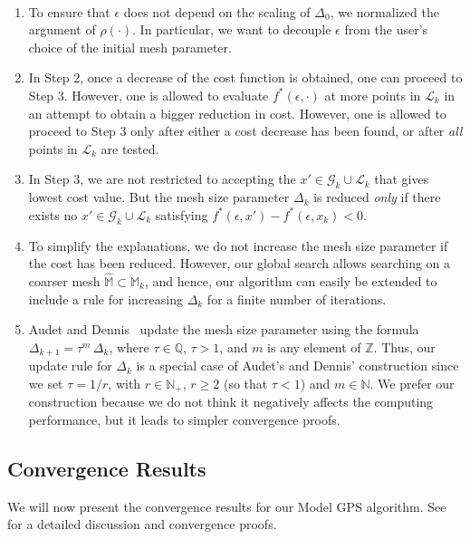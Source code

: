 \begin{remark}~\newline 
\vspace{-1.5\baselineskip}
{ \em 
\begin{enumerate} 
\item
To ensure that $\epsilon$ does not depend on the scaling of $\Delta_0$,
we normalized the argument of $\rho(\cdot)$.
In particular, we want to decouple $\epsilon$ from
the user's choice of the initial mesh parameter.
\item
In Step 2, once a decrease of the cost function is obtained, one
can proceed to Step 3. However, one is allowed to evaluate $f^*(\epsilon,\cdot)$
at more points in $\mathcal L_k$ in an
attempt to obtain a bigger reduction in cost.  However,
one is allowed to proceed to Step 3 only after 
either a cost decrease has been found, or after {\em all} points in 
$\mathcal L_k$ are tested.
\item
In Step 3, we are not restricted to accepting the
$x' \in \mathcal G_k \cup \mathcal L_k$ that gives lowest cost value.
But the mesh size parameter $\Delta_k$ is reduced {\em only}
if there exists no $x' \in \mathcal G_k \cup \mathcal L_k$ satisfying
$f^*(\epsilon, x') - f^*(\epsilon, x_k) < 0$.
\item
To simplify the explanations, we do
not increase the mesh size parameter if the cost has been reduced.
However, our global search allows searching on a coarser mesh 
$\widehat {\mathbb M} \subset \mathbb M_k$,
and hence, our algorithm can easily be extended to include a rule for increasing
$\Delta_k$ for a finite number of iterations.
\item
Audet and Dennis~\cite{AudetDennis2003} update the mesh size parameter 
using the formula $\Delta_{k+1} = \tau^m \, \Delta_k$, 
where $\tau \in \mathbb Q$, $\tau > 1$, and $m$ is any
element of $\mathbb Z$. Thus, our update rule for $\Delta_k$ is a special case of
Audet's and Dennis' construction since we set $\tau = 1/r$, with
$r \in \mathbb N_+$, $r \ge 2$ (so that $\tau < 1$) and $m \in 
\mathbb N$. We prefer our construction because we do not think it negatively affects
the computing performance, but it leads to simpler convergence proofs.
\rbox
\end{enumerate}
}
\end{remark}

\subsection{Convergence Results}
We will now present the convergence results for our Model GPS algorithm.
See~\cite{PolakWetter2003:1} for a detailed discussion and convergence proofs.

